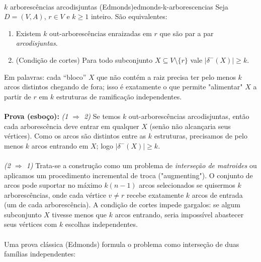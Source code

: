 \documentclass[12pt,a4paper]{article}
\begin{document}
\paragraph{}
\begin{teobox}{$k$ arborescências arcodisjuntas (Edmonds)}{edmonds-k-arborescencias}
Seja $D=(V,A)$, $r\in V$ e $k\ge 1$ inteiro. São equivalentes:
\begin{enumerate}\setlength{\itemsep}{4pt}
    \item Existem $k$ out-arborescências enraizadas em $r$ que são par a par \emph{arcodisjuntas}.
    \item (Condição de cortes) Para todo subconjunto $X\subseteq V\setminus\{r\}$ vale $|\delta^-(X)| \ge k$.
\end{enumerate}
Em palavras: cada “bloco” $X$ que não contém a raiz precisa ter pelo menos $k$ arcos distintos chegando de fora; isso é exatamente o que permite "alimentar" $X$ a partir de $r$ em $k$ estruturas de ramificação independentes.

\paragraph{}
\textbf{Prova (esboço):}
\emph{(1 $\Rightarrow$ 2)} Se temos $k$ out-arborescências arcodisjuntas, então cada arborescência deve entrar em qualquer $X$ (senão não alcançaria seus vértices). Como os arcos são distintos entre as $k$ estruturas, precisamos de pelo menos $k$ arcos entrando em $X$; logo $|\delta^-(X)|\ge k$.

\paragraph{}
\emph{(2 $\Rightarrow$ 1)} Trata-se a construção como um problema de \emph{interseção de matroides} ou aplicamos um procedimento incremental de troca ("augmenting"). O conjunto de arcos pode suportar no máximo $k(n-1)$ arcos selecionados se quisermos $k$ arborescências, onde cada vértice $v \neq r$ recebe exatamente $k$ arcos de entrada (um de cada arborescência). A condição de cortes impede gargalos: se algum subconjunto $X$ tivesse menos que $k$ arcos entrando, seria impossível abastecer seus vértices com $k$ escolhas independentes.

\paragraph{}
Uma prova clássica (Edmonds) formula o problema como interseção de duas famílias independentes: 


\end{teobox}
\end{document}
